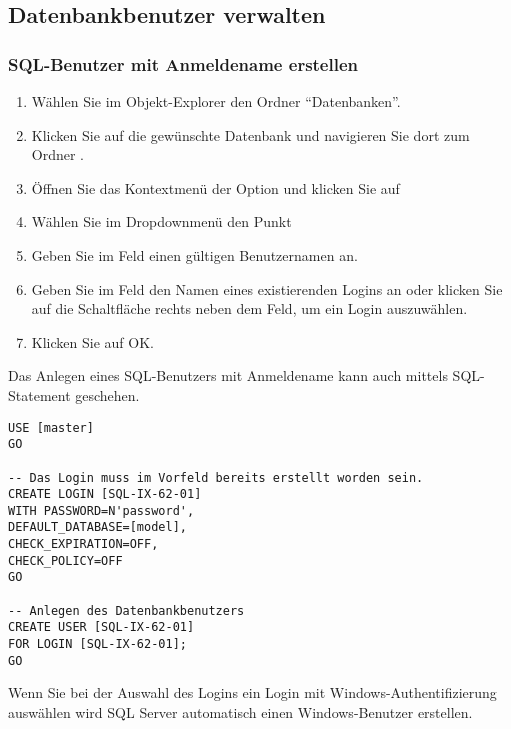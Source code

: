         \subsection{Datenbankbenutzer verwalten}
          \subsubsection{SQL-Benutzer mit Anmeldename erstellen}
            \begin{enumerate}
              \item Wählen Sie im Objekt-Explorer den Ordner
              \enquote{Datenbanken}.
              \item Klicken Sie auf die gewünschte Datenbank und navigieren
              Sie dort zum Ordner .
              \item Öffnen Sie das Kontextmenü der Option 
              und klicken Sie auf 
              \item Wählen Sie im Dropdownmenü  den Punkt
              \item Geben Sie im Feld  einen gültigen
              Benutzernamen an.
              \item Geben Sie im Feld  den Namen eines
              existierenden Logins an oder klicken Sie auf die Schaltfläche
              rechts neben dem Feld, um ein Login auszuwählen.
              \item Klicken Sie auf OK.
            \end{enumerate}
            Das Anlegen eines SQL-Benutzers mit Anmeldename kann auch mittels
            SQL-Statement geschehen.
            \begin{lstlisting}[language=ms_sql, caption={Anlegen eines
            SQL-Benutzers mit Anmeldename}, label=admin19_12]
USE [master]
GO

-- Das Login muss im Vorfeld bereits erstellt worden sein.
CREATE LOGIN [SQL-IX-62-01]
WITH PASSWORD=N'password', 
DEFAULT_DATABASE=[model], 
CHECK_EXPIRATION=OFF, 
CHECK_POLICY=OFF
GO

-- Anlegen des Datenbankbenutzers
CREATE USER [SQL-IX-62-01]
FOR LOGIN [SQL-IX-62-01];
GO
            \end{lstlisting}
\clearpage
            \begin{merke}
              Wenn Sie bei der Auswahl des Logins ein Login mit
              Windows-Authentifizierung auswählen wird SQL Server automatisch
              einen Windows-Benutzer erstellen.
            \end{merke}            
